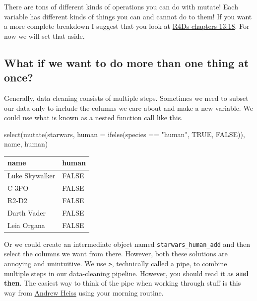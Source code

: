 \documentclass[
  letterpaper,
  DIV=11,
  numbers=noendperiod,
  oneside]{scrreprt}
\newenvironment{Shaded}{\begin{snugshade}}{\end{snugshade}}
\newcommand{\AttributeTok}[1]{\textcolor[rgb]{0.40,0.45,0.13}{#1}}
\newcommand{\ConstantTok}[1]{\textcolor[rgb]{0.56,0.35,0.01}{#1}}
\newcommand{\FunctionTok}[1]{\textcolor[rgb]{0.28,0.35,0.67}{#1}}
\newcommand{\NormalTok}[1]{\textcolor[rgb]{0.00,0.23,0.31}{#1}}
\newcommand{\SpecialCharTok}[1]{\textcolor[rgb]{0.37,0.37,0.37}{#1}}
\newcommand{\StringTok}[1]{\textcolor[rgb]{0.13,0.47,0.30}{#1}}
\begin{document}
There are tons of different kinds of operations you can do with mutate!
Each variable has different kinds of things you can and cannot do to
them! If you want a more complete breakdown I suggest that you look at
\href{https://r4ds.hadley.nz/transform}{R4Ds chapters 13:18}. For now we
will set that aside.

\hypertarget{what-if-we-want-to-do-more-than-one-thing-at-once}{%
\subsection{What if we want to do more than one thing at
once?}\label{what-if-we-want-to-do-more-than-one-thing-at-once}}

Generally, data cleaning consists of multiple steps. Sometimes we need
to subset our data only to include the columns we care about and make a
new variable. We could use what is known as a nested function call like
this.

\begin{Shaded}
\begin{Highlighting}[]
\FunctionTok{select}\NormalTok{(}\FunctionTok{mutate}\NormalTok{(starwars, }\AttributeTok{human =} \FunctionTok{ifelse}\NormalTok{(species }\SpecialCharTok{==} \StringTok{"human"}\NormalTok{, }\ConstantTok{TRUE}\NormalTok{, }\ConstantTok{FALSE}\NormalTok{)), name, human)}
\end{Highlighting}
\end{Shaded}

\begin{tabular}{l|l}
\hline
name & human\\
\hline
Luke Skywalker & FALSE\\
\hline
C-3PO & FALSE\\
\hline
R2-D2 & FALSE\\
\hline
Darth Vader & FALSE\\
\hline
Leia Organa & FALSE\\
\hline
\end{tabular}

Or we could create an intermediate object named
\texttt{starwars\_human\_add} and then select the columns we want from
there. However, both these solutions are annoying and unintuitive. We
use \texttt{\textbar{}\textgreater{}}, technically called a pipe, to
combine multiple steps in our data-cleaning pipeline. However, you
should read it as \textbf{and then}. The easiest way to think of the
pipe when working through stuff is this way from
\href{https://twitter.com/andrewheiss/status/1359583543509348356?lang=en}{Andrew
Heiss} using your morning routine.
\end{document}
